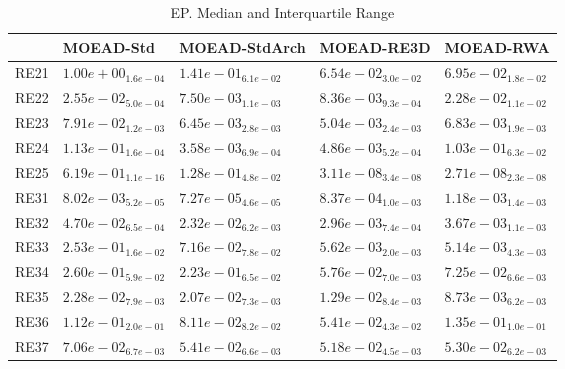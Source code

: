 \documentclass{article}
\begin{document}
\begin{table}
\caption{EP. Median and Interquartile Range}
\label{table: EP}
\centering
\begin{scriptsize}
\begin{tabular}{lllll}
\hline & MOEAD-Std & MOEAD-StdArch & MOEAD-RE3D &  MOEAD-RWA\\
\hline 
RE21 & $  1.00e+00_{ 1.6e-04}$ & $  1.41e-01_{ 6.1e-02}$ & \cellcolor{gray95}$  6.54e-02_{ 3.0e-02}$ & \cellcolor{gray25}$  6.95e-02_{ 1.8e-02}$ \\
RE22 & $  2.55e-02_{ 5.0e-04}$ & \cellcolor{gray95}$  7.50e-03_{ 1.1e-03}$ & \cellcolor{gray25}$  8.36e-03_{ 9.3e-04}$ & $  2.28e-02_{ 1.1e-02}$ \\
RE23 & $  7.91e-02_{ 1.2e-03}$ & \cellcolor{gray25}$  6.45e-03_{ 2.8e-03}$ & \cellcolor{gray95}$  5.04e-03_{ 2.4e-03}$ & $  6.83e-03_{ 1.9e-03}$ \\
RE24 & $  1.13e-01_{ 1.6e-04}$ & \cellcolor{gray95}$  3.58e-03_{ 6.9e-04}$ & \cellcolor{gray25}$  4.86e-03_{ 5.2e-04}$ & $  1.03e-01_{ 6.3e-02}$ \\
RE25 & $  6.19e-01_{ 1.1e-16}$ & $  1.28e-01_{ 4.8e-02}$ & \cellcolor{gray25}$  3.11e-08_{ 3.4e-08}$ & \cellcolor{gray95}$  2.71e-08_{ 2.3e-08}$ \\
RE31 & $  8.02e-03_{ 5.2e-05}$ & \cellcolor{gray95}$  7.27e-05_{ 4.6e-05}$ & \cellcolor{gray25}$  8.37e-04_{ 1.0e-03}$ & $  1.18e-03_{ 1.4e-03}$ \\
RE32 & $  4.70e-02_{ 6.5e-04}$ & $  2.32e-02_{ 6.2e-03}$ & \cellcolor{gray95}$  2.96e-03_{ 7.4e-04}$ & \cellcolor{gray25}$  3.67e-03_{ 1.1e-03}$ \\
RE33 & $  2.53e-01_{ 1.6e-02}$ & $  7.16e-02_{ 7.8e-02}$ & \cellcolor{gray25}$  5.62e-03_{ 2.0e-03}$ & \cellcolor{gray95}$  5.14e-03_{ 4.3e-03}$ \\
RE34 & $  2.60e-01_{ 5.9e-02}$ & $  2.23e-01_{ 6.5e-02}$ & \cellcolor{gray95}$  5.76e-02_{ 7.0e-03}$ & \cellcolor{gray25}$  7.25e-02_{ 6.6e-03}$ \\
RE35 & $  2.28e-02_{ 7.9e-03}$ & $  2.07e-02_{ 7.3e-03}$ & \cellcolor{gray25}$  1.29e-02_{ 8.4e-03}$ & \cellcolor{gray95}$  8.73e-03_{ 6.2e-03}$ \\
RE36 & $  1.12e-01_{ 2.0e-01}$ & \cellcolor{gray25}$  8.11e-02_{ 8.2e-02}$ & \cellcolor{gray95}$  5.41e-02_{ 4.3e-02}$ & $  1.35e-01_{ 1.0e-01}$ \\
RE37 & $  7.06e-02_{ 6.7e-03}$ & $  5.41e-02_{ 6.6e-03}$ & \cellcolor{gray95}$  5.18e-02_{ 4.5e-03}$ & \cellcolor{gray25}$  5.30e-02_{ 6.2e-03}$ \\

\end{tabular}
\end{scriptsize}
\end{table}
\end{document}

